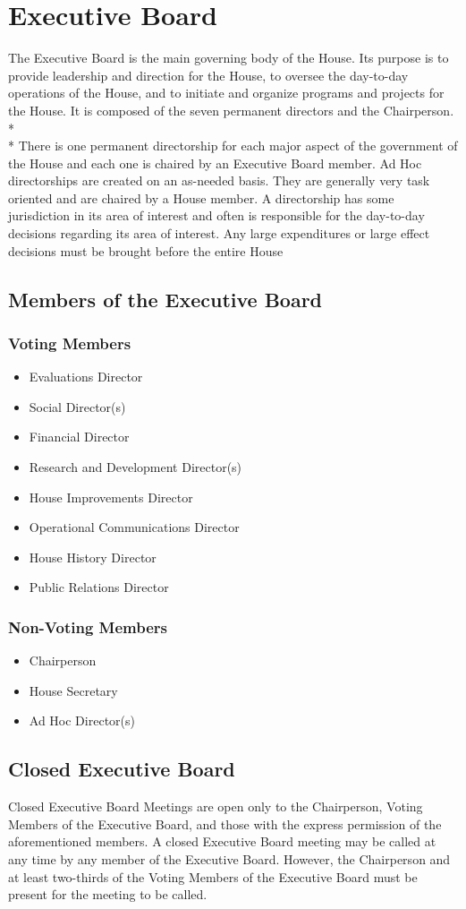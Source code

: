 \documentclass{article}
\newcommand{\article}[1]{\section{#1} \label{#1}}
\newcommand{\asection}[1]{\subsection{#1} \label{#1}}
\newcommand{\asubsection}[1]{\subsubsection{#1} \label{#1}}
\begin{document}
\article{Executive Board}
The Executive Board is the main governing body of the House.
Its purpose is to provide leadership and direction for the House, to oversee the day-to-day operations of the House, and to initiate and organize programs and projects for the House.
It is composed of the seven permanent directors and the Chairperson.
\\*\\*
There is one permanent directorship for each major aspect of the government of the House and each one is chaired by an Executive Board member.
Ad Hoc directorships are created on an as-needed basis.
They are generally very task oriented and are chaired by a House member.
A directorship has some jurisdiction in its area of interest and often is responsible for the day-to-day decisions regarding its area of interest.
Any large expenditures or large effect decisions must be brought before the entire House
\asection{Members of the Executive Board}
\asubsection{Voting Members}
\begin{itemize}
	\item Evaluations Director
	\item Social Director(s)
	\item Financial Director
	\item Research and Development Director(s)
	\item House Improvements Director
	\item Operational Communications Director
	\item House History Director
	\item Public Relations Director
\end{itemize}
\asubsection{Non-Voting Members}
\begin{itemize}
	\item Chairperson
	\item House Secretary
	\item Ad Hoc Director(s)
\end{itemize}
\asection{Closed Executive Board}
Closed Executive Board Meetings are open only to the Chairperson, Voting Members of the Executive Board, and those with the express permission of the aforementioned members.
A closed Executive Board meeting may be called at any time by any member of the Executive Board.
However, the Chairperson and at least two-thirds of the Voting Members of the Executive Board must be present for the meeting to be called.
\end{document}
